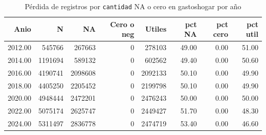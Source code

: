 \begin{table}[ht]
\centering
\caption{P\'erdida de registros por \texttt{cantidad} NA o cero en gastoshogar por a\~{n}o} 
\label{tab:01_perdida_cantidad}
\begin{tabular}{rrrrrrrr}
  \toprule
Anio & N & NA & Cero o neg & Utiles & pct NA & pct cero & pct util \\ 
  \midrule
2012.00 & 545766 & 267663 &   0 & 278103 & 49.00 & 0.00 & 51.00 \\ 
  2014.00 & 1191694 & 589132 &   0 & 602562 & 49.40 & 0.00 & 50.60 \\ 
  2016.00 & 4190741 & 2098608 &   0 & 2092133 & 50.10 & 0.00 & 49.90 \\ 
  2018.00 & 4405250 & 2205452 &   0 & 2199798 & 50.10 & 0.00 & 49.90 \\ 
  2020.00 & 4948444 & 2472201 &   0 & 2476243 & 50.00 & 0.00 & 50.00 \\ 
  2022.00 & 5075174 & 2625747 &   0 & 2449427 & 51.70 & 0.00 & 48.30 \\ 
  2024.00 & 5311497 & 2836778 &   0 & 2474719 & 53.40 & 0.00 & 46.60 \\ 
   \bottomrule
\end{tabular}
\end{table}
